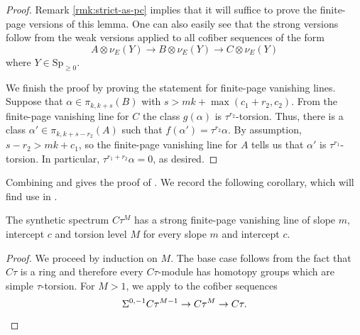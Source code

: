 \begin{proof}
  Remark \ref{rmk:strict-as-pc} implies that it will suffice to prove the finite-page versions of this lemma. One can also easily see that the strong versions follow from the weak versions applied to all cofiber sequences of the form
  $$ A \otimes \nu_E (Y) \to B \otimes \nu_E (Y) \to C \otimes \nu_E (Y) $$
  where $Y \in \text{Sp}_{\geq 0}$.
  

  We finish the proof by proving the statement for finite-page vanishing lines. Suppose that $\alpha \in \pi_{k,k+s}(B)$ with $s > mk + \max(c_1+r_2,c_2)$. From the finite-page vanishing line for $C$ the class $g(\alpha)$ is $\tau^{r_2}$-torsion. Thus, there is a class $\alpha' \in \pi_{k,k+s-r_2}(A)$ such that $f(\alpha') = \tau^{r_2}\alpha$. By assumption, $s-r_2 > mk + c_1$, so the finite-page vanishing line for $A$ tells us that $\alpha'$ is $\tau^{r_1}$-torsion. In particular, $\tau^{r_1+r_2}\alpha = 0$, as desired.
\end{proof}

Combining  and  gives the proof of .
We record the following corollary, which will find use in .

\begin{cor} \label{cor:ctau-vl}
  The synthetic spectrum $C\tau^M$ has a strong finite-page vanishing line of slope $m$, intercept $c$ and torsion level $M$ for every slope $m$ and intercept $c$.
\end{cor}

\begin{proof}
  We proceed by induction on $M$.
  The base case follows from the fact that $C\tau$ is a ring \cite[Corollary 4.45]{Pstragowski} and therefore every $C\tau$-module has homotopy groups which are simple $\tau$-torsion. For $M > 1$, we apply  to the cofiber sequences
  \[ \Sigma^{0,-1} C\tau^{M-1} \to C\tau^M \to C\tau. \qedhere \]
\end{proof}

